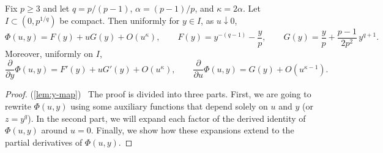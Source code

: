 \documentclass{article}
\newcommand\linktoproof[1]{{\hspace{-0.3em}\normalfont[{\hyperlink{proof:#1}{$\downarrow$}}]}}
\newcommand{\newtarget}[1]{\hypertarget{#1}{}}
\newcommand\linkofproof[1]{(\cref{#1})\newtarget{proof:#1}\ }
\begin{document}
\begin{lemma}\label{lem:y-map}\linktoproof{lem:y-map}
    Fix $p\ge 3$ and let $q=p/(p-1)$, $\alpha=(p-1)/p$, and $\kappa=2\alpha$.
    Let $I\subset(0,p^{1/q})$ be compact.
    Then uniformly for $y\in I$, as $u\downarrow 0$,
    \begin{equation}\label{eq:y-map}
        \Phi(u,y)
        = F(y)+uG(y)+O(u^\kappa),
        \qquad
        F(y)=y^{-(q-1)}-\frac{y}{p},
        \qquad
        G(y)=\frac{y}{p}+\frac{p-1}{2p^2}\,y^{q+1}.
    \end{equation}
    Moreover, uniformly on $I$,
    \[
        \frac{\partial}{\partial y}\Phi(u,y)=F'(y)+uG'(y)+O(u^\kappa),
        \qquad
        \frac{\partial}{\partial u}\Phi(u,y)=G(y)+O(u^{\kappa-1}).
    \]
\end{lemma}
\begin{proof}\linkofproof{lem:y-map}
    The proof is divided into three parts.
    First, we are going to rewrite $\Phi(u,y)$ using some auxiliary functions that depend solely on $u$ and $y$ (or $z = y^q$).
    In the second part, we will expand each factor of the derived identity of $\Phi(u,y)$ around $u=0$.
    Finally, we show how these expansions extend to the partial derivatives of $\Phi(u,y)$.


\end{proof}
\end{document}
